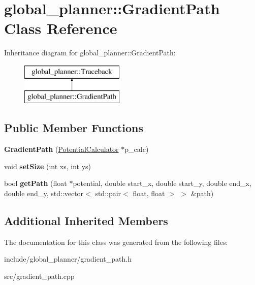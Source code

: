 \hypertarget{classglobal__planner_1_1_gradient_path}{}\section{global\+\_\+planner\+:\+:Gradient\+Path Class Reference}
\label{classglobal__planner_1_1_gradient_path}
Inheritance diagram for global\+\_\+planner\+:\+:Gradient\+Path\+:\begin{figure}[H]
\begin{center}
\leavevmode
\includegraphics[height=2.000000cm]{classglobal__planner_1_1_gradient_path}
\end{center}
\end{figure}
\subsection*{Public Member Functions}
\begin{DoxyCompactItemize}
\item 
\mbox{\label{classglobal__planner_1_1_gradient_path_a57de63c14757b1f84ede9cefac3c3902}} 
{\bfseries Gradient\+Path} (\mbox{\hyperlink{classglobal__planner_1_1_potential_calculator}{Potential\+Calculator}} $\ast$p\+\_\+calc)
\item 
\mbox{\label{classglobal__planner_1_1_gradient_path_a58c7221bd0f4891a218403206953c0b4}} 
void {\bfseries set\+Size} (int xs, int ys)
\item 
\mbox{\label{classglobal__planner_1_1_gradient_path_a740775a18f446f585017e7051850a8bf}} 
bool {\bfseries get\+Path} (float $\ast$potential, double start\+\_\+x, double start\+\_\+y, double end\+\_\+x, double end\+\_\+y, std\+::vector$<$ std\+::pair$<$ float, float $>$ $>$ \&path)
\end{DoxyCompactItemize}
\subsection*{Additional Inherited Members}


The documentation for this class was generated from the following files\+:\begin{DoxyCompactItemize}
\item 
include/global\+\_\+planner/gradient\+\_\+path.\+h\item 
src/gradient\+\_\+path.\+cpp\end{DoxyCompactItemize}
